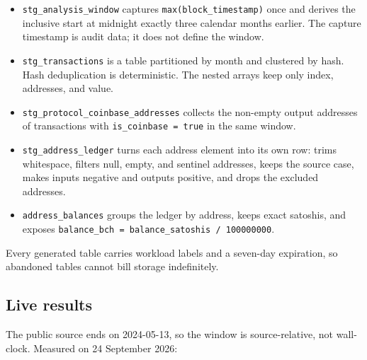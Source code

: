 \documentclass[10pt,a4paper]{article}
\newcommand{\code}[1]{\nolinkurl{#1}}
\begin{document}
\begin{itemize}
  \item \code{stg_analysis_window} captures
        \code{max(block_timestamp)} once and derives the inclusive start
        at midnight exactly three calendar months earlier. The capture
        timestamp is audit data; it does not define the window.
  \item \code{stg_transactions} is a table partitioned by month and
        clustered by hash. Hash deduplication is deterministic. The
        nested arrays keep only index, addresses, and value.
  \item \code{stg_protocol_coinbase_addresses} collects the non-empty
        output addresses of transactions with
        \code{is_coinbase = true} in the same window.
  \item \code{stg_address_ledger} turns each address element into its
        own row: trims whitespace, filters null, empty, and sentinel
        addresses, keeps the source case, makes inputs negative and
        outputs positive, and drops the excluded addresses.
  \item \code{address_balances} groups the ledger by address, keeps
        exact satoshis, and exposes
        \code{balance_bch = balance_satoshis / 100000000}.
\end{itemize}

Every generated table carries workload labels and a seven-day
expiration, so abandoned tables cannot bill storage indefinitely.

\subsection{Live results}
\label{sec:cost}

The public source ends on 2024-05-13, so the window is source-relative,
not wall-clock. Measured on 24 September 2026:
\end{document}
